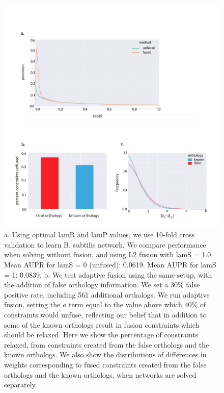 \documentclass[11pt]{article}
\begin{document}
\begin{figure}
\begin{center}
  \includegraphics[scale=0.45]{fig5_2.pdf}
  \caption{\label{xspecies-real} a. Using optimal lamR and lamP values, we use 10-fold cross validation to learn B. subtilis network. We compare performance when solving without fusion, and using L2 fusion with lamS = 1.0. Mean AUPR for lamS = 0 (unfused): 0.0619. Mean AUPR for lamS = 1: 0.0839. b. We test adaptive fusion using the same setup, with the addition of false orthology information. We set a 30\% false positive rate, including 561 additional orthologs. We run adaptive fusion, setting the $a$ term equal to the value above which 40\% of constraints would unfuse, reflecting our belief that in addition to some of the known orthologs result in fusion constraints which should be relaxed. Here we show the percentage of constraints relaxed, from constraints created from the false orthologs and the known orthologs. We also show the distributions of differences in weights corresponding to fused constraints created from the false orthologs and the known orthologs, when networks are solved separately. }
\end{center}
\end{figure}
\end{document}
